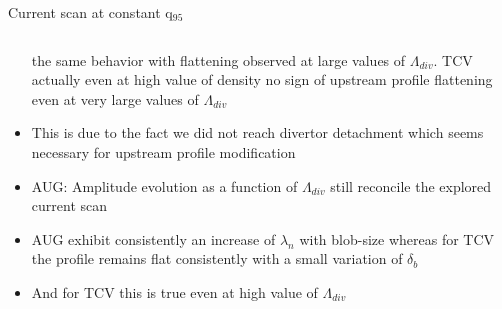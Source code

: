 \documentclass[10pt, compress]{beamer}
\begin{document}
\begin{frame}{Current scan at constant q$_{95}$}
\begin{columns}
\begin{column}{0.4\textwidth}
\begin{itemize}
          the same behavior with flattening observed at large values
          of $\Lambda_{div}$. TCV actually even at high value of
          density no sign of upstream profile flattening \alert{even
            at very large values of $\Lambda_{div}$}
        \item<6|only@6> This is due to the fact we did not reach
          divertor detachment which \alert{seems necessary for
            upstream profile modification}  
        \item<7|only@7> AUG: Amplitude evolution as a function of $\Lambda_{div}$ 
          still reconcile the explored current scan
        \item<8|only@8> AUG exhibit consistently an increase of
          $\lambda_n$ with blob-size whereas for TCV the profile
          remains flat consistently with a small variation of
          $\delta_b$
        \item<9|only@9> And for TCV this is true even at high value of $\Lambda_{div}$
      \end{itemize}
    \end{column}
  \end{columns}
\end{frame}
\end{document}
